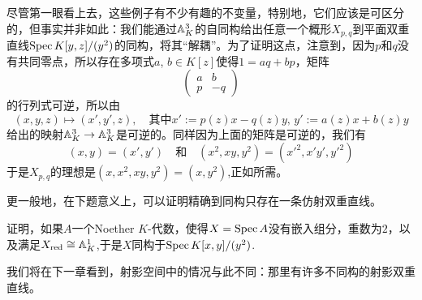 尽管第一眼看上去，这些例子有不少有趣的不变量，特别地，它们应该是可区分的，但事实并非如此：我们能通过$\mathbb{A}_{K}^3$的自同构给出任意一个概形$X_{p,q}$到平面双重直线$\operatorname{Spec} K[y,z]/(y^2)$的同构，将其“解耦”。为了证明这点，注意到，因为$p$和$q$没有共同零点，所以存在多项式$a$, $b\in K[z]$使得$1=aq+bp$，矩阵
\[
	\begin{pmatrix}
	a&b\\
	p&-q
	\end{pmatrix}
\]
的行列式可逆，所以由
\[
	(x,y,z)\mapsto (x',y',z),\quad \text{其中$x':=p(z)x-q(z)y$, $y':=a(z)x+b(z)y$}
\]
给出的映射$\mathbb{A}_K^3\to \mathbb{A}_K^3$是可逆的。同样因为上面的矩阵是可逆的，我们有
\[
	(x,y)=(x',y')\quad\text{和}\quad (x^2,xy,y^2)=({x'}^2,x'y',{y'}^2)
\]
于是$X_{p,q}$的理想是$(x,x^2,xy,y^2)=(x,y^2)$,正如所需。

更一般地，在下题意义上，可以证明精确到同构只存在一条仿射双重直线。

\begin{exe}
	证明，如果$A$一个Noether $K$\hyp 代数，使得$X=\operatorname{Spec} A$没有嵌入组分，重数为$2$，以及满足$X_{\text{red}}\cong \mathbb{A}_K^1$,于是$X$同构于$\operatorname{Spec} K[x,y]/(y^2)$.
\end{exe}

我们将在下一章看到，射影空间中的情况与此不同：那里有许多不同构的射影双重直线。